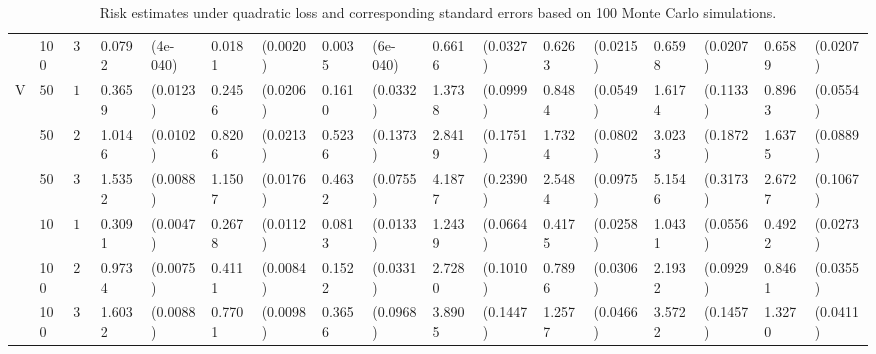\begin{table}[H]
\begin{footnotesize}
\begin{tabular}{lllllllllllllllll}
    & 100  & $30$ & 0.0792 & (4e-040) & 0.0181 & (0.0020) & 0.0035 & (6e-040) & 0.6616 & (0.0327) & 0.6263 & (0.0215) & 0.6598 & (0.0207) & 0.6589 & (0.0207) \\ 
  V & $50$ & $10$ & 0.3659 & (0.0123) & 0.2456 & (0.0206) & 0.1610 & (0.0332) & 1.3738 & (0.0999) & 0.8484 & (0.0549) & 1.6174 & (0.1133) & 0.8963 & (0.0554) \\ 
    & 50  & $20$ & 1.0146 & (0.0102) & 0.8206 & (0.0213) & 0.5236 & (0.1373) & 2.8419 & (0.1751) & 1.7324 & (0.0802) & 3.0233 & (0.1872) & 1.6375 & (0.0889) \\ 
    &  50 & $30$ & 1.5352 & (0.0088) & 1.1507 & (0.0176) & 0.4632 & (0.0755) & 4.1877 & (0.2390) & 2.5484 & (0.0975) & 5.1546 & (0.3173) & 2.6727 & (0.1067) \\ 
    & $100$ & $10$ & 0.3091 & (0.0047) & 0.2678 & (0.0112) & 0.0813 & (0.0133) & 1.2439 & (0.0664) & 0.4175 & (0.0258) & 1.0431 & (0.0556) & 0.4922 & (0.0273) \\ 
    &  100 & $20$ & 0.9734 & (0.0075) & 0.4111 & (0.0084) & 0.1522 & (0.0331) & 2.7280 & (0.1010) & 0.7896 & (0.0306) & 2.1932 & (0.0929) & 0.8461 & (0.0355) \\ 
    &  100 & $30$ & 1.6032 & (0.0088) & 0.7701 & (0.0098) & 0.3656 & (0.0968) & 3.8905 & (0.1447) & 1.2577 & (0.0466) & 3.5722 & (0.1457) & 1.3270 & (0.0411) \\ 
   \hline
\end{tabular}
\caption{Risk estimates under quadratic loss and corresponding standard errors based on
                              100 Monte Carlo simulations.} 
\end{footnotesize}
\end{table}
